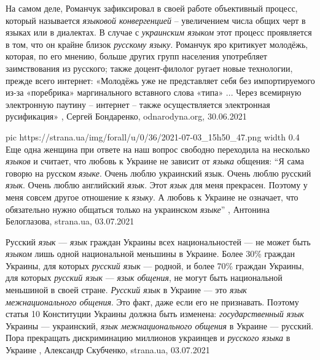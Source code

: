 На самом деле, Романчук зафиксировал в своей работе объективный процесс,
который называется \emph{языковой конвергенцией} – увеличением числа общих черт в
языках или в диалектах. В случае с \emph{украинским языком} этот процесс проявляется в
том, что он крайне близок \emph{русскому языку}. Романчук яро критикует молодёжь,
которая, по его мнению, больше других групп населения употребляет заимствования
из русского; также доцент-филолог ругает новые технологии, прежде всего
интернет: «Молодёжь уже не представляет себя без импортируемого из-за
«поребрика» маргинального вставного слова «типа» ... Через всемирную
электронную паутину – интернет – также осуществляется электронная русификация»
, 
Сергей Бондаренко, odnarodyna.org, 30.06.2021

\ifcmt
  pic https://strana.ua/img/forall/u/0/36/2021-07-03_15h50_47.png
	width 0.4
\fi
Еще одна женщина при ответе на наш вопрос свободно переходила на несколько
\emph{языков} и считает, что любовь к Украине не зависит от \emph{языка} общения:
\enquote{Я сама говорю на русском \emph{языке}. Очень люблю украинский язык. Очень люблю
русский \emph{язык}. Очень люблю английский \emph{язык}. Этот \emph{язык} для меня прекрасен.
Поэтому у меня совсем другое отношение к \emph{языку}. А любовь к Украине не означает,
что обязательно нужно общаться только на украинском \emph{языке}}
, 
Антонина Белоглазова, strana.ua, 03.07.2021



Русский \emph{язык} — \emph{язык} граждан Украины всех национальностей — не
может быть \emph{языком} лишь одной национальной меньшины в Украине. Более 30\%
граждан Украины, для которых \emph{русский язык} — родной, и более 70\% граждан
Украины, для которых \emph{русский язык} — \emph{язык общения}, не могут быть
национальной меньшиной в своей стране.
\emph{Русский язык} в Украине — это \emph{язык межнационального общения}. Это
факт, даже если его не признавать. Поэтому статья 10 Конституции Украины должна
быть изменена: \emph{государственный язык} Украины — украинский, \emph{язык
межнационального общения} в Украине — русский. Пора прекращать дискриминацию
миллионов украинцев и \emph{русского языка} в Украине
, 
Александр Скубченко, strana.ua, 03.07.2021

